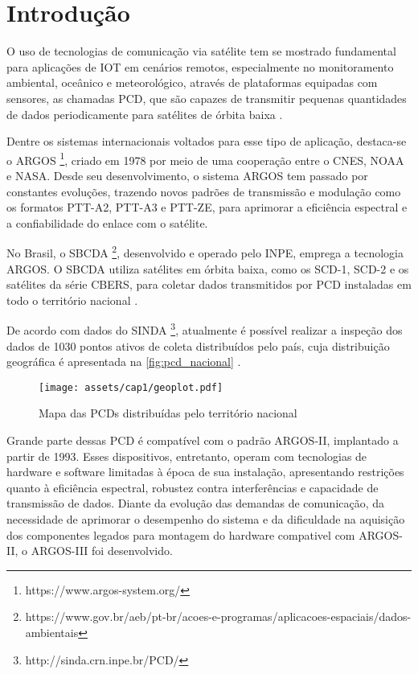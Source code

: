 \chapter{Introdução}\label{cap:introducao}

O uso de tecnologias de comunicação via satélite tem se mostrado fundamental para aplicações de \gls{IOT} em cenários remotos, especialmente no monitoramento ambiental, oceânico e meteorológico, através de plataformas equipadas com sensores, as chamadas \gls{PCD}, que são capazes de transmitir pequenas quantidades de dados periodicamente para satélites de órbita baixa \cite{Centenaro-2021, fraire_direct--satellite_2019}.

Dentre os sistemas internacionais voltados para esse tipo de aplicação, destaca-se o \gls{ARGOS} \footnote{https://www.argos-system.org/}, criado em 1978 por meio de uma cooperação entre o \gls{CNES}, \gls{NOAA} e \gls{NASA}. Desde seu desenvolvimento, o sistema \gls{ARGOS} tem passado por constantes evoluções, trazendo novos padrões de transmissão e modulação como os formatos \gls{PTT-A2}, \gls{PTT-A3} e \gls{PTT-ZE}, para aprimorar a eficiência espectral e a confiabilidade do enlace com o satélite. 

No Brasil, o \gls{SBCDA} \footnote{https://www.gov.br/aeb/pt-br/acoes-e-programas/aplicacoes-espaciais/dados-ambientais}, desenvolvido e operado pelo \gls{INPE}, emprega a tecnologia \gls{ARGOS}. O \gls{SBCDA} utiliza satélites em órbita baixa, como os \gls{SCD-1}, \gls{SCD-2} e os satélites da série \gls{CBERS}, para coletar dados transmitidos por \gls{PCD} instaladas em todo o território nacional \cite{rodrigues_demodulador_2018, duarte_multiuser_2021}. 

De acordo com dados do \gls{SINDA} \footnote{http://sinda.crn.inpe.br/PCD/}, atualmente é possível realizar a inspeção dos dados de 1030 pontos ativos de coleta distribuídos pelo país, cuja distribuição geográfica é apresentada na \autoref{fig:pcd_nacional} \cite{silva_um_2022}. 

\newpage
\begin{figure}[ht]
	\centering
	\caption{Mapa das PCDs distribuídas pelo território nacional}\label{fig:pcd_nacional}
	\texttt{[image: assets/cap1/geoplot.pdf]}
\end{figure}


Grande parte dessas \gls{PCD} é compatível com o padrão \gls{ARGOS-II}, implantado a partir de 1993. Esses dispositivos, entretanto, operam com tecnologias de hardware e software limitadas à época de sua instalação, apresentando restrições quanto à eficiência espectral, robustez contra interferências e capacidade de transmissão de dados. Diante da evolução das demandas de comunicação, da necessidade de aprimorar o desempenho do sistema e da dificuldade na aquisição dos componentes legados para montagem do hardware compativel com \gls{ARGOS-II}, o \gls{ARGOS-III} foi desenvolvido.

